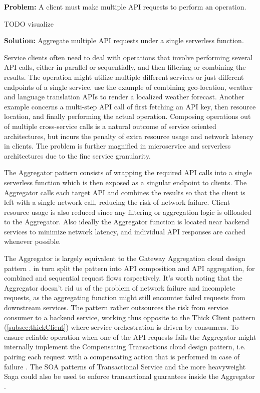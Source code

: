 \textbf{Problem:} A client must make multiple API requests to perform an operation.

TODO visualize

\textbf{Solution:} Aggregate multiple API requests under a single serverless function.

Service clients often need to deal with operations that involve performing several API calls, either in parallel or sequentially, and then filtering or combining the results. The operation might utilize multiple different services or just different endpoints of a single service. \textcite{baldini17currentTrends} use the example of combining geo-location, weather and language translation APIs to render a localized weather forecast. Another example concerns a multi-step API call of first fetching an API key, then resource location, and finally performing the actual operation. Composing operations out of multiple cross-service calls is a natural outcome of service oriented architectures, but incurs the penalty of extra resource usage and network latency in clients. The problem is further magnified in microservice and serverless architectures due to the fine service granularity. \parencite{microsoft18cloudPatterns}

The Aggregator pattern consists of wrapping the required API calls into a single serverless function which is then exposed as a singular endpoint to clients. The Aggregator calls each target API and combines the results so that the client is left with a single network call, reducing the risk of network failure. Client resource usage is also reduced since any filtering or aggregation logic is offloaded to the Aggregator. Also ideally the Aggregator function is located near backend services to minimize network latency, and individual API responses are cached whenever possible. \parencite{baldini17currentTrends}

The Aggregator is largely equivalent to the Gateway Aggregation cloud design pattern \parencite{microsoft18cloudPatterns}. \textcite{baldini17currentTrends} in turn split the pattern into API composition and API aggregation, for combined and sequential request flows respectively. It's worth noting that the Aggregator doesn't rid us of the problem of network failure and incomplete requests, as the aggregating function might still encounter failed requests from downstream services. The pattern rather outsources the risk from service consumer to a backend service, working thus opposite to the Thick Client pattern (\ref{subsec:thickClient}) where service orchestration is driven by consumers. To ensure reliable operation when one of the API requests fails the Aggregator might internally implement the Compensating Transactions cloud design pattern, i.e. pairing each request with a compensating action that is performed in case of failure \parencite{microsoft18cloudPatterns}. The SOA patterns of Transactional Service and the more heavyweight Saga could also be used to enforce transactional guarantees inside the Aggregator \parencite{rotem12soa}.

